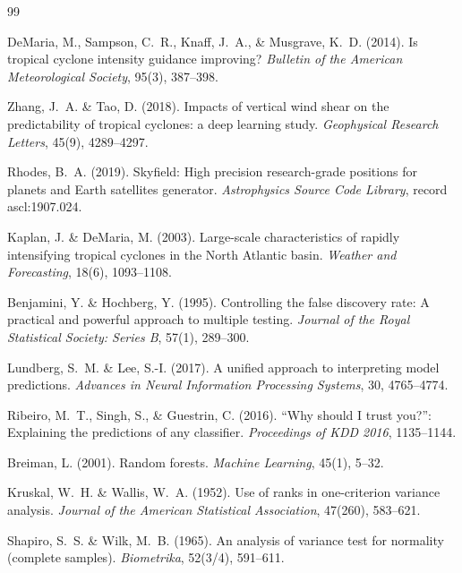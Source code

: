 \documentclass[12pt,a4paper]{article}
\begin{document}

\begin{thebibliography}{99}

DeMaria, M., Sampson, C.~R., Knaff, J.~A., \& Musgrave, K.~D. (2014).
Is tropical cyclone intensity guidance improving?
\textit{Bulletin of the American Meteorological Society}, 95(3), 387--398.

Zhang, J.~A. \& Tao, D. (2018).
Impacts of vertical wind shear on the predictability of tropical cyclones:
a deep learning study.
\textit{Geophysical Research Letters}, 45(9), 4289--4297.

Rhodes, B.~A. (2019).
Skyfield: High precision research-grade positions for planets and Earth
satellites generator.
\textit{Astrophysics Source Code Library}, record ascl:1907.024.

Kaplan, J. \& DeMaria, M. (2003).
Large-scale characteristics of rapidly intensifying tropical cyclones in the
North Atlantic basin.
\textit{Weather and Forecasting}, 18(6), 1093--1108.

Benjamini, Y. \& Hochberg, Y. (1995).
Controlling the false discovery rate: A practical and powerful approach to
multiple testing.
\textit{Journal of the Royal Statistical Society: Series B}, 57(1), 289--300.

Lundberg, S.~M. \& Lee, S.-I. (2017).
A unified approach to interpreting model predictions.
\textit{Advances in Neural Information Processing Systems}, 30, 4765--4774.

Ribeiro, M.~T., Singh, S., \& Guestrin, C. (2016).
``Why should I trust you?'': Explaining the predictions of any classifier.
\textit{Proceedings of KDD 2016}, 1135--1144.

Breiman, L. (2001).
Random forests.
\textit{Machine Learning}, 45(1), 5--32.

Kruskal, W.~H. \& Wallis, W.~A. (1952).
Use of ranks in one-criterion variance analysis.
\textit{Journal of the American Statistical Association}, 47(260), 583--621.

Shapiro, S.~S. \& Wilk, M.~B. (1965).
An analysis of variance test for normality (complete samples).
\textit{Biometrika}, 52(3/4), 591--611.


\end{thebibliography}
\end{document}
